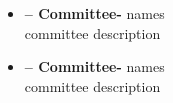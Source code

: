 
\begin{itemize}

\item \textbf{-- Committee-} names \\ committee description

\item \textbf{-- Committee-} names \\ committee description

\end{itemize} 

